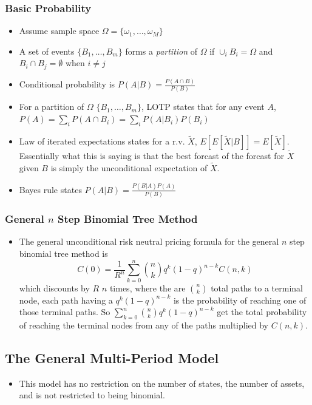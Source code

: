 \documentclass[11pt]{article}
\begin{document}
\subsubsection{Basic Probability}
\begin{itemize}
    \item Assume sample space $\Omega = \{\omega_1, \ldots, \omega_M\}$
    \item A set of events $\{B_1, \ldots, B_m\}$ forms a \textit{partition} of $\Omega$ if 
    $\cup_i B_i = \Omega$ and $B_i \cap B_j = \emptyset$ when $i \ne j$
    \item Conditional probability is $P(A|B) = \frac{P(A \cap B)}{P(B)}$
    \item For a partition of $\Omega$ $\{B_1, \ldots, B_m\}$, LOTP states that for any event 
    $A$, $P(A)= \sum_i P(A \cap B_i) = \sum_i P(A|B_i)P(B_i)$
    \item Law of iterated expectations states for a r.v. $\tilde{X}$, $E[E[\tilde{X}|B]] = 
    E[\tilde{X}]$. Essentially what this is saying is that the best forcast of the forcast for
    $\tilde{X}$ given $B$ is simply the unconditional expectation of $\tilde{X}$.
    \item Bayes rule states $P(A|B) = \frac{P(B|A)P(A)}{P(B)}$
\end{itemize}

\subsubsection{General $n$ Step Binomial Tree Method}

\begin{itemize}
    \item The general unconditional risk neutral pricing formula for the general $n$ step 
    binomial tree method is 
    \[C(0) = \frac{1}{R^n}\sum_{k=0}^{n} {n \choose k} q^k {(1-q)}^{n-k} C(n,k)\]
    which discounts by $R$ $n$ times, where the are $ {n \choose k} $ total paths to a 
    terminal node, each path having a $q^k {(1-q)}^{n-k}$ is the probability of reaching one 
    of those terminal paths. So $\sum_{k=0}^{n} {n \choose k} q^k {(1-q)}^{n-k}$ get the total 
    probability of reaching the terminal nodes from any of the paths multiplied by $C(n,k)$.
\end{itemize}

\subsection{The General Multi-Period Model}
\begin{itemize}
    \item This model has no restriction on the number of states, the number of assets, and is 
    not restricted to being binomial. 
\end{itemize}
\end{document}
